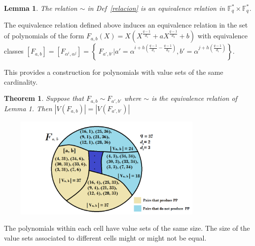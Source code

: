 \documentclass[landscape,final,paperwidth=48in,paperheight=36in]{baposter}
\newtheorem*{example*}{Example}
\newtheorem{lemma}{Lemma}
\newtheorem{theorem}{Theorem}
\begin{document}
\begin{poster}
{\begin{lemma}
  The relation $\sim$ in Def~\ref{relacion} is an equivalence relation in $\mathbb{F}_q^* \times \mathbb{F}_q^*$.

\end{lemma}


  The equivalence relation defined above induces an equivalence relation in the set of polynomials of the form $F_{a,b}(X) = X(X^{\frac{q-1}{d_1}} + aX^{\frac{q-1}{d_2}} +b)$ with equivalence classes $[F_{a,b}] = [F_{\alpha^i, \alpha^j}] = \left\{\ F_{a',b'} | a' = \alpha^{i+h(\frac{q-1}{d_1} - \frac{q-1}{d_2})}, b' = \alpha^{j+h(\frac{q-1}{d_1})} \right\}$.

  This provides a construction for polynomials with value sets of the same cardinality. 
\begin{theorem}
  
  Suppose that $F_{a,b} \sim F_{a',b'}$ where $\sim$ is the equivalence relation of Lemma 1. Then $|V(F_{a,b})| = |V(F_{a',b'})|$

\end{theorem}

\includegraphics[width=11cm, height=5cm]{clases}

{\small * The polynomials within each cell have value sets of the same size. The size of the value sets associated to different cells might or might not be equal.}

}\label{Results}

\end{poster}
\end{document}
